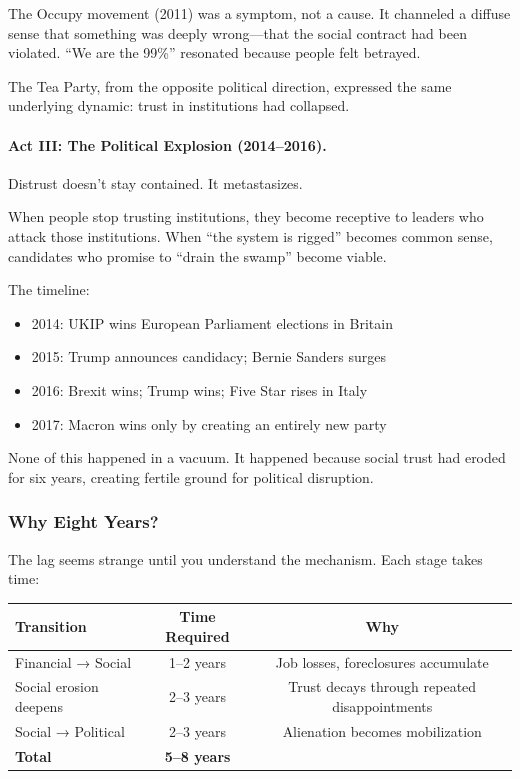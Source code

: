 The Occupy movement (2011) was a symptom, not a cause. It channeled 
a diffuse sense that something was deeply wrong---that the social 
contract had been violated. ``We are the 99\%'' resonated because 
people felt betrayed.

The Tea Party, from the opposite political direction, expressed the 
same underlying dynamic: trust in institutions had collapsed.

\paragraph{Act III: The Political Explosion (2014--2016).}

Distrust doesn't stay contained. It metastasizes.

When people stop trusting institutions, they become receptive to 
leaders who attack those institutions. When ``the system is rigged'' 
becomes common sense, candidates who promise to ``drain the swamp'' 
become viable.

The timeline:
\begin{itemize}
    \item 2014: UKIP wins European Parliament elections in Britain
    \item 2015: Trump announces candidacy; Bernie Sanders surges
    \item 2016: Brexit wins; Trump wins; Five Star rises in Italy
    \item 2017: Macron wins only by creating an entirely new party
\end{itemize}

None of this happened in a vacuum. It happened because social trust 
had eroded for six years, creating fertile ground for political disruption.

\subsubsection{Why Eight Years?}

The lag seems strange until you understand the mechanism. Each stage 
takes time:

\begin{center}
\renewcommand{\arraystretch}{1.3}
\begin{tabular}{lcc}
\hline
\textbf{Transition} & \textbf{Time Required} & \textbf{Why} \\
\hline
Financial → Social & 1--2 years & Job losses, foreclosures accumulate \\
Social erosion deepens & 2--3 years & Trust decays through repeated disappointments \\
Social → Political & 2--3 years & Alienation becomes mobilization \\
\hline
\textbf{Total} & \textbf{5--8 years} & \\
\hline
\end{tabular}
\end{center}

